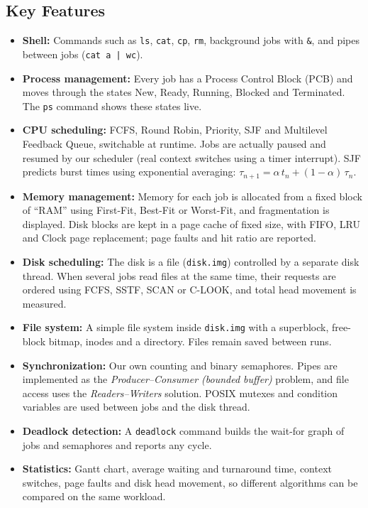 \documentclass[11pt,a4paper]{article}
\begin{document}
\subsection*{Key Features}
\begin{itemize}[leftmargin=*, itemsep=2pt]
    \item \textbf{Shell:} Commands such as \texttt{ls}, \texttt{cat}, \texttt{cp}, \texttt{rm}, background jobs with \texttt{\&}, and pipes between jobs (\mbox{\texttt{cat a | wc}}).
    \item \textbf{Process management:} Every job has a Process Control Block (PCB) and moves through the states New, Ready, Running, Blocked and Terminated. The \texttt{ps} command shows these states live.
    \item \textbf{CPU scheduling:} FCFS, Round Robin, Priority, SJF and Multilevel Feedback Queue, switchable at runtime. Jobs are actually paused and resumed by our scheduler (real context switches using a timer interrupt). SJF predicts burst times using exponential averaging: $\tau_{n+1} = \alpha\, t_n + (1-\alpha)\,\tau_n$.
    \item \textbf{Memory management:} Memory for each job is allocated from a fixed block of ``RAM'' using First-Fit, Best-Fit or Worst-Fit, and fragmentation is displayed. Disk blocks are kept in a page cache of fixed size, with FIFO, LRU and Clock page replacement; page faults and hit ratio are reported.
    \item \textbf{Disk scheduling:} The disk is a file (\texttt{disk.img}) controlled by a separate disk thread. When several jobs read files at the same time, their requests are ordered using FCFS, SSTF, SCAN or C-LOOK, and total head movement is measured.
    \item \textbf{File system:} A simple file system inside \texttt{disk.img} with a superblock, free-block bitmap, inodes and a directory. Files remain saved between runs.
    \item \textbf{Synchronization:} Our own counting and binary semaphores. Pipes are implemented as the \emph{Producer--Consumer (bounded buffer)} problem, and file access uses the \emph{Readers--Writers} solution. POSIX mutexes and condition variables are used between jobs and the disk thread.
    \item \textbf{Deadlock detection:} A \texttt{deadlock} command builds the wait-for graph of jobs and semaphores and reports any cycle.
    \item \textbf{Statistics:} Gantt chart, average waiting and turnaround time, context switches, page faults and disk head movement, so different algorithms can be compared on the same workload.
\end{itemize}
\end{document}
